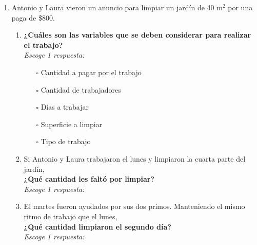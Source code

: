 \documentclass[11pt]{book}
\begin{document}
\begin{enumerate}
  \item Antonio y Laura vieron un anuncio para limpiar un jardín de 40 m$^2$ por una paga de \$800.
        \begin{enumerate}
          \item \textbf{¿Cuáles son las variables que se deben considerar para realizar el trabajo?}\\
                \emph{Escoge 1 respuesta:}

                \begin{enumerate}
                  \item[\color{colorrds}\Large$\square$] Cantidad a pagar por el trabajo
                  \item[\color{colorrds}\Large$\square$] Cantidad de trabajadores
                  \item[\color{colorrds}\Large$\square$] Días a trabajar
                  \item[\color{colorrds}\Large$\square$] Superficie a limpiar
                  \item[\color{colorrds}\Large$\square$] Tipo de trabajo
                \end{enumerate}

          \item Si Antonio y Laura trabajaron el lunes y limpiaron la cuarta parte del jardín, \\
                \textbf{¿Qué cantidad les faltó por limpiar?}\\
                \emph{Escoge 1 respuesta:}


          \item El martes fueron ayudados por sus dos primos. Manteniendo el mismo ritmo de trabajo que el lunes,\\
                \textbf{¿Qué cantidad limpiaron el segundo día?}\\
                \emph{Escoge 1 respuesta:}


\end{enumerate}
\end{enumerate}
\end{document}
